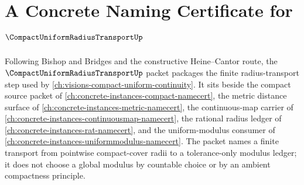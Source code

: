 \chapter{A Concrete Naming Certificate for $\CompactUniformRadiusTransportUp$}
\label{ch:concrete-instances-compact-uniform-radius-transport-namecert}

Following Bishop and Bridges and the constructive Heine--Cantor route, the $\CompactUniformRadiusTransportUp$ packet packages the finite radius-transport step used by \autoref{ch:visions-compact-uniform-continuity}. It sits beside the compact source packet of \autoref{ch:concrete-instances-compact-namecert}, the metric distance surface of \autoref{ch:concrete-instances-metric-namecert}, the continuous-map carrier of \autoref{ch:concrete-instances-continuousmap-namecert}, the rational radius ledger of \autoref{ch:concrete-instances-rat-namecert}, and the uniform-modulus consumer of \autoref{ch:concrete-instances-uniformmodulus-namecert}. The packet names a finite transport from pointwise compact-cover radii to a tolerance-only modulus ledger; it does not choose a global modulus by countable choice or by an ambient compactness principle.

